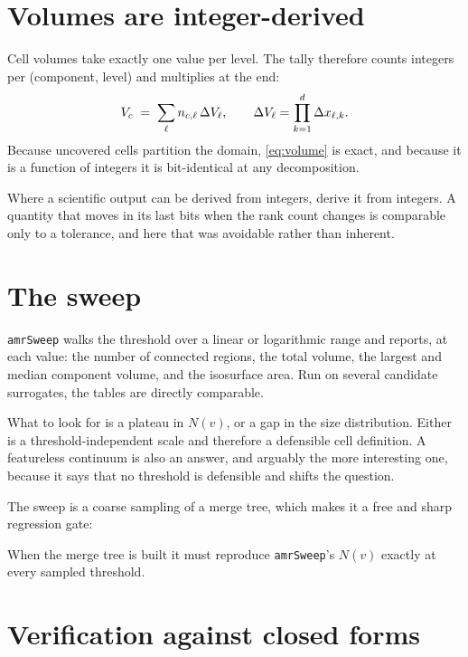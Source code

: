\section{Volumes are integer-derived}
\label{sec:intvol}

Cell volumes take exactly one value per level. The tally therefore counts
integers per (component, level) and multiplies at the end:
\begin{equation}
  V_c \;=\; \sum_{\ell} n_{c,\ell}\,\Delta V_{\ell},
  \qquad \Delta V_{\ell} = \prod_{k=1}^{d} \Delta x_{\ell,k}.
  \label{eq:volume}
\end{equation}
Because uncovered cells partition the domain, \cref{eq:volume} is exact, and
because it is a function of integers it is bit-identical at any decomposition.

\begin{designrule}\label{rule:intout}
Where a scientific output can be derived from integers, derive it from integers.
A quantity that moves in its last bits when the rank count changes is
comparable only to a tolerance, and here that was avoidable rather than
inherent.
\end{designrule}

\section{The sweep}

\texttt{amrSweep} walks the threshold over a linear or logarithmic range and
reports, at each value: the number of connected regions, the total volume, the
largest and median component volume, and the isosurface area. Run on several
candidate surrogates, the tables are directly comparable.

What to look for is a plateau in $N(v)$, or a gap in the size distribution.
Either is a threshold-independent scale and therefore a defensible cell
definition. A featureless continuum is also an answer, and arguably the more
interesting one, because it says that no threshold is defensible and shifts the
question.

The sweep is a coarse sampling of a merge tree, which makes it a free and sharp
regression gate:

\begin{designrule}\label{rule:sweepgate}
When the merge tree is built it must reproduce \texttt{amrSweep}'s $N(v)$
exactly at every sampled threshold.
\end{designrule}

\section{Verification against closed forms}

